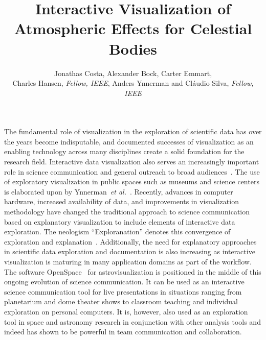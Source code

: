 \documentclass[journal]{vgtc}                %
\title{Interactive Visualization of Atmospheric Effects for Celestial Bodies}
\author{Jonathas Costa, Alexander Bock, Carter Emmart, \\Charles Hansen, \textit{Fellow, IEEE}, Anders Ynnerman and Cl\'audio Silva, \textit{Fellow, IEEE}}
\newcommand{\etal}{\emph{et al.}}
\newcommand{\review}[1]{{\color{blue}#1}}
\begin{document}

\maketitle




The fundamental role of visualization in the exploration of scientific data has over the years become indisputable, and documented successes of visualization as an enabling technology across many disciplines create a solid foundation for the research field. Interactive data visualization also serves an increasingly important role in science communication and general outreach to broad audiences~\cite{ynnerman:16:inside}. The use of exploratory visualization in public spaces such as museums and science centers is elaborated upon by Ynnerman~\etal ~\cite{ynnerman:exploranation}. Recently, advances in computer hardware, increased availability of data, and improvements in visualization methodology have changed the traditional approach to science communication based on explanatory visualization to include elements of interactive data exploration.
The neologism ``Exploranation'' denotes this convergence of exploration and explanation~\cite{ynnerman:exploranation}. Additionally, the need for explanatory approaches in scientific data exploration and documentation is also increasing as interactive visualization is maturing in many application domains as part of the workflow. The software OpenSpace~\cite{OpenSpace:2020} for astrovisualization is positioned in the middle of this \review{ongoing} evolution of science communication. It can be used as an interactive science communication tool for live presentations in situations ranging from planetarium and dome theater shows to classroom teaching and individual exploration on personal computers. It is, however, also used as an exploration tool in space and astronomy research in conjunction with other analysis tools and indeed has shown to be powerful in team communication and collaboration. 
\end{document}
